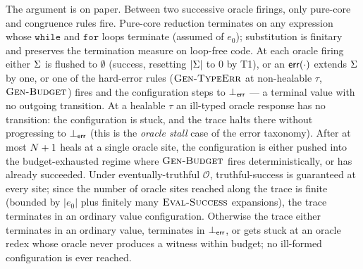 \label{app:proof-term}
The argument is on paper. Between two successive oracle firings, only pure-core and congruence rules fire. Pure-core reduction terminates on any expression whose $\texttt{while}$ and $\texttt{for}$ loops terminate (assumed of $e_0$); substitution is finitary and preserves the termination measure on loop-free code. At each oracle firing either $\Sigma$ is flushed to $\emptyset$ (success, resetting $|\Sigma|$ to $0$ by T1), or an $\mathsf{err}(\cdot)$ extends $\Sigma$ by one, or one of the hard-error rules ($\textsc{Gen-TypeErr}$ at non-healable $\tau$, $\textsc{Gen-Budget}$) fires and the configuration steps to $\bot_{\mathsf{err}}$ --- a terminal value with no outgoing transition. At a healable $\tau$ an ill-typed oracle response has no transition: the configuration is stuck, and the trace halts there without progressing to $\bot_{\mathsf{err}}$ (this is the \emph{oracle stall} case of the error taxonomy). After at most $N + 1$ heals at a single oracle site, the configuration is either pushed into the budget-exhausted regime where $\textsc{Gen-Budget}$ fires deterministically, or has already succeeded. Under eventually-truthful $\mathcal{O}$, truthful-success is guaranteed at every site; since the number of oracle sites reached along the trace is finite (bounded by $|e_0|$ plus finitely many $\textsc{Eval-Success}$ expansions), the trace terminates in an ordinary value configuration. Otherwise the trace either terminates in an ordinary value, terminates in $\bot_{\mathsf{err}}$, or gets stuck at an oracle redex whose oracle never produces a witness within budget; no ill-formed configuration is ever reached.



